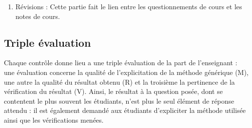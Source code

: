\begin{enumerate}
\begin{enumerate}
 	\item Exemple : un exemple est traité en détail dans cette partie en suivant la 
 		démarche \textsc{Mrv}. Ce sont de tels exemples qui ont été présentés dans la section
 		\ref{sec:exemples} du présent document.
 		
 	\item Questions : 24 questions de même difficulté sont proposées ici pour permettre 
 		à chaque étudiant de s'entraîner sur le problème à traiter. La résolution de 2 
 		ou 3 de ces exemples l'aide ainsi à induire (à faire émerger) la méthode générique qui
 		est attendue ainsi qu'à mener explicitement les vérifications souhaitées.
 		
 		Le jour de l'évaluation, chaque étudiant traite individuellement une des 24
 		questions tirée au sort le jour du contrôle (une question différente par élève). 
 		Lors de cette évaluation, tous documents, calculettes, téléphones et ordinateurs 
 		sont interdits.
 		A la fin de chaque contrôle, il est demandé à chaque étudiant de s'auto-évaluer 
		pour chacune des étapes de la méthode \textsc{Mrv} selon une grille de notation 
		à 4 niveaux (voir section \ref{subsec:mrv} suivante).
		Enfin, une correction est proposée par l'enseignant juste après le
		contrôle, « à chaud ».
 		
 	\end{enumerate}
\item Révisions : Cette partie fait le lien entre les questionnements de cours et les 
	notes de cours.
\end{enumerate}

\subsection{Triple évaluation}\label{subsec:mrv}
Chaque contrôle donne lieu a une triple évaluation de la part de l'enseignant : 
une évaluation concerne la qualité de l'explicitation de la méthode générique (M), 
une autre la qualité du résultat obtenu (R) et la troisième la pertinence de la 
vérification du résultat (V). Ainsi, le résultat à la question posée, dont se
contentent le plus souvent les étudiants, n'est plus le seul élément de réponse attendu :
il est également demandé aux étudiants d'expliciter la méthode utilisée ainsi
que les vérifications menées.

